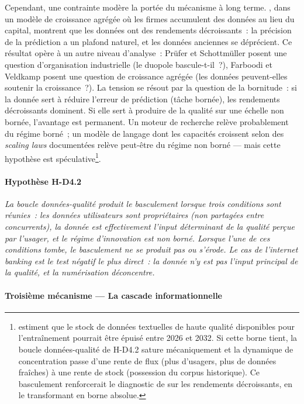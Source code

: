 Cependant, une contrainte modère la portée du mécanisme à long terme. \textcite{farboodi_data_2022}, dans un modèle de croissance agrégée où les firmes accumulent des données au lieu du capital, montrent que les données ont des rendements décroissants~: la précision de la prédiction a un plafond naturel, et les données anciennes se déprécient. Ce résultat opère à un autre niveau d'analyse~: Prüfer et Schottmüller posent une question d'organisation industrielle (le duopole bascule-t-il~?), Farboodi et Veldkamp posent une question de croissance agrégée (les données peuvent-elles soutenir la croissance~?). La tension se résout par la question de la bornitude~: si la donnée sert à réduire l'erreur de prédiction (tâche bornée), les rendements décroissants dominent. Si elle sert à produire de la qualité sur une échelle non bornée, l'avantage est permanent. Un moteur de recherche relève probablement du régime borné~; un modèle de langage dont les capacités croissent selon des \emph{scaling laws} documentées \parencite{kaplan_scaling_2020,hoffmann_training_2022} relève peut-être du régime non borné --- mais cette hypothèse est spéculative\footnote{\textcite{villalobos_will_2024} estiment que le stock de données textuelles de haute qualité disponibles pour l'entraînement pourrait être épuisé entre 2026 et 2032. Si cette borne tient, la boucle données-qualité de H-D4.2 sature mécaniquement et la dynamique de concentration passe d'une rente de flux (plus d'usagers, plus de données fraîches) à une rente de stock (possession du corpus historique). Ce basculement renforcerait le diagnostic de \textcite{farboodi_data_2022} sur les rendements décroissants, en le transformant en borne absolue.}.

\paragraph{Hypothèse H-D4.2} \emph{La boucle données-qualité produit le basculement lorsque trois conditions sont réunies~: les données utilisateurs sont propriétaires (non partagées entre concurrents), la donnée est effectivement l'input déterminant de la qualité perçue par l'usager, et le régime d'innovation est non borné. Lorsque l'une de ces conditions tombe, le basculement ne se produit pas ou s'érode. Le cas de l'internet banking \parencite{lyons_digital_2024} est le test négatif le plus direct~: la donnée n'y est pas l'input principal de la qualité, et la numérisation déconcentre.}


\paragraph{Troisième mécanisme --- La cascade informationnelle}

